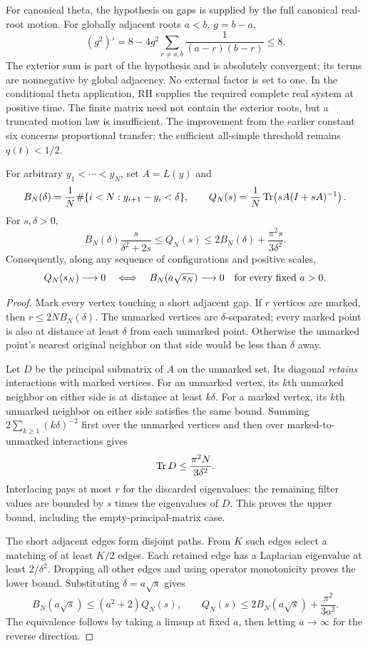 For canonical theta, the hypothesis on gaps is supplied by the full
canonical real-root motion. For globally adjacent roots $a<b$, $g=b-a$,
\[
 (g^2)'=8-4g^2\sum_{r\ne a,b}\frac1{(a-r)(b-r)}\le8.
\]
The exterior sum is part of the hypothesis and is absolutely convergent;
its terms are nonnegative by global adjacency. No external factor is set to
one. In the conditional theta application, RH supplies the required complete
real system at positive time. The finite matrix need not contain the exterior
roots, but a truncated motion law is insufficient. The improvement from the
earlier constant six concerns proportional transfer; the sufficient
all-simple threshold remains $q(t)<1/2$.

\begin{theorem}
\label{thm:gap-filter}
For arbitrary $y_1<\cdots<y_N$, set $A=L(y)$ and
\[
 B_N(\delta)=\frac1N\#\{i<N:y_{i+1}-y_i<\delta\},\qquad
 Q_N(s)=\frac1N\operatorname{Tr}\!\left(sA(I+sA)^{-1}\right).
\]
For $s,\delta>0$,
\begin{equation}
 B_N(\delta)\frac{s}{\delta^2+2s}
 \le Q_N(s)\le2B_N(\delta)+\frac{\pi^2s}{3\delta^2}.
 \label{eq:gap-filter-two-sided}
\end{equation}
Consequently, along any sequence of configurations and positive scales,
\[
 Q_N(s_N)\longrightarrow0
 \quad\Longleftrightarrow\quad
 B_N(a\sqrt{s_N})\longrightarrow0\quad\hbox{for every fixed }a>0.
\]
\end{theorem}
\begin{proof}
Mark every vertex touching a short adjacent gap. If $r$ vertices are marked,
then $r\le2NB_N(\delta)$. The unmarked vertices are $\delta$-separated;
every marked point is also at distance at least $\delta$ from each
unmarked point. Otherwise the unmarked point's nearest original neighbor
on that side would be less than $\delta$ away.

Let $D$ be the principal submatrix of $A$ on the unmarked set. Its diagonal
\emph{retains} interactions with marked vertices. For an unmarked vertex,
its $k$th unmarked neighbor on either side is at distance at least $k\delta$.
For a marked vertex, its $k$th unmarked neighbor on either side satisfies the
same bound. Summing $2\sum_{k\ge1}(k\delta)^{-2}$ first over the unmarked
vertices and then over marked-to-unmarked interactions gives
\[
 \operatorname{Tr} D\le\frac{\pi^2N}{3\delta^2}.
\]
Interlacing pays at most $r$ for the discarded eigenvalues; the remaining
filter values are bounded by $s$ times the eigenvalues of $D$. This proves
the upper bound, including the empty-principal-matrix case.

The short adjacent edges form disjoint paths. From $K$ such edges select a
matching of at least $K/2$ edges. Each retained edge has a Laplacian
eigenvalue at least $2/\delta^2$. Dropping all other edges and using operator
monotonicity proves the lower bound. Substituting $\delta=a\sqrt{s}$ gives
\[
 B_N(a\sqrt{s})\le(a^2+2)Q_N(s),\qquad
 Q_N(s)\le2B_N(a\sqrt{s})+\frac{\pi^2}{3a^2}.
\]
The equivalence follows by taking a limsup at fixed $a$, then letting
$a\to\infty$ for the reverse direction.
\end{proof}

